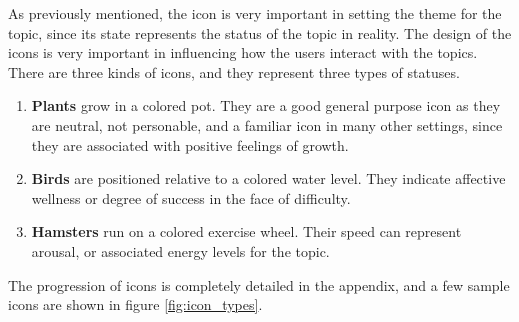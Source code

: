       As previously mentioned, the icon is very important in setting
      the theme for the topic, since its state represents the status of the topic
      in reality.
      The design of the icons is very important in influencing how
      the users interact with the topics. 
      There are three kinds of icons, and they represent three types of statuses.
      \begin{enumerate}
      \item \textbf{Plants} grow in a colored pot. They are a good general purpose icon as they are neutral,
      not personable, and a familiar icon in many other settings,
      since they are associated with positive feelings of growth.
      \item \textbf{Birds} are positioned relative to a colored water level.
      They indicate affective wellness or degree of success in the face of difficulty.
      \item \textbf{Hamsters} run on a colored exercise wheel.
      Their speed can represent arousal,
      or associated energy levels for the topic.
      \end{enumerate}
      The progression of icons is completely detailed in the appendix,
      and a few sample icons are shown in figure \ref{fig:icon_types}.

